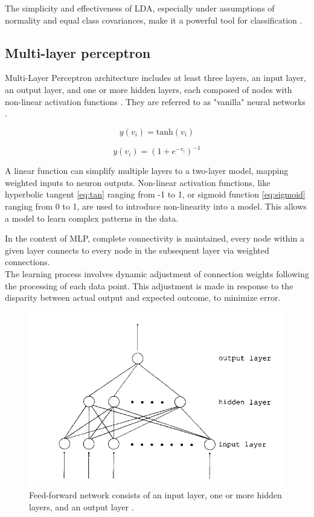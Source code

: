             The simplicity and effectiveness of LDA, especially under assumptions of normality and equal class covariances, make it a powerful tool for classification \cite{balakrishnama_linear_nodate}.

        \subsection{Multi-layer perceptron}
            Multi-Layer Perceptron architecture includes at least three layers, an input layer, an output layer, and one or more hidden layers, each composed of nodes with non-linear activation functions \cite{svozil_introduction_1997}. They are referred to as "vanilla" neural networks \cite{hastie_elements_2009}.

        \begin{equation}\label{eq:tan}
            y(v_i) = \text{tanh}(v_i) 
        \end{equation}

        \begin{equation}\label{eq:sigmoid}
            y(v_i) = (1+e^{-v_i})^{-1} 
        \end{equation}

            A linear function can simplify multiple layers to a two-layer model, mapping weighted inputs to neuron outputs. Non-linear activation functions, like hyperbolic tangent \ref{eq:tan} ranging from -1 to 1, or sigmoid function \ref{eq:sigmoid} ranging from 0 to 1, are used to introduce non-linearity into a model. This allows a model to learn complex patterns in the data.

        \newpage

        In the context of MLP, complete connectivity is maintained, every node within a given layer connects to every node in the subsequent layer via weighted connections. \\
        The learning process involves dynamic adjustment of connection weights following the processing of each data point. This adjustment is made in response to the disparity between actual output and expected outcome, to minimize error.

        \begin{figure}[H]
            \centering
            \includegraphics[width=.7\textwidth]{../src/resources/images/models/feedforward.png}
            \caption{
                Feed-forward network consists of an input layer, one or more hidden layers, and an output layer \cite{svozil_introduction_1997}.
            }
            \label{fig:multi_layer_perceptron}
        \end{figure}
    
